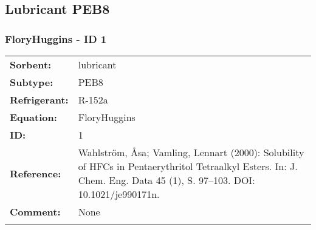 \subsection{Lubricant PEB8}
%
\subsubsection{FloryHuggins - ID 1}
%
\begin{tabular}[l]{|lp{11.5cm}|}
\hline
\addlinespace

\textbf{Sorbent:} & lubricant \\
\textbf{Subtype:} & PEB8 \\
\textbf{Refrigerant:} & R-152a \\
\textbf{Equation:} & FloryHuggins \\
\textbf{ID:} & 1 \\
\textbf{Reference:} & Wahlström, Åsa; Vamling, Lennart (2000): Solubility of HFCs in Pentaerythritol Tetraalkyl Esters. In: J. Chem. Eng. Data 45 (1), S. 97–103. DOI: 10.1021/je990171n. \\
\textbf{Comment:} & None \\

\addlinespace
\hline
\end{tabular}
\newline

